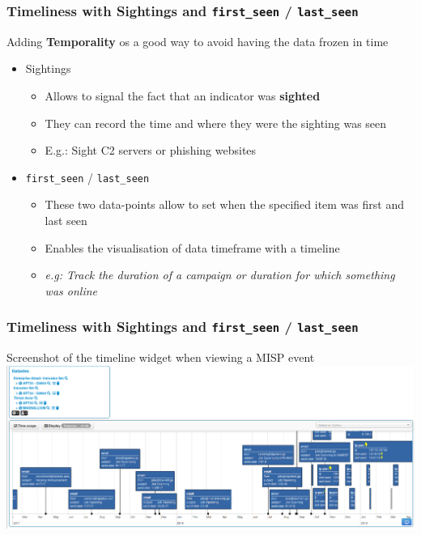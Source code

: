\begin{frame}
    \frametitle{Timeliness with Sightings and \texttt{first\_seen} / \texttt{last\_seen}}
    Adding \textbf{Temporality} os a good way to avoid having the data frozen in time
    \begin{itemize}
        \item Sightings
        \begin{itemize}
            \item Allows to signal the fact that an indicator was \textbf{sighted}
            \item They can record the time and where they were the sighting was seen
            \item E.g.: Sight C2 servers or phishing websites
        \end{itemize}
        \item \texttt{first\_seen} / \texttt{last\_seen}
        \begin{itemize}
            \item These two data-points allow to set when the specified item was first and last seen
            \item Enables the visualisation of data timeframe with a timeline
            \item \textit{e.g: Track the duration of a campaign or duration for which something was online}
        \end{itemize}
    \end{itemize}
\end{frame}

\begin{frame}
    \frametitle{Timeliness with Sightings and \texttt{first\_seen} / \texttt{last\_seen}}
    Screenshot of the timeline widget when viewing a MISP event
    \includegraphics[width=1.0\linewidth]{pictures/timeline.png}
\end{frame}

